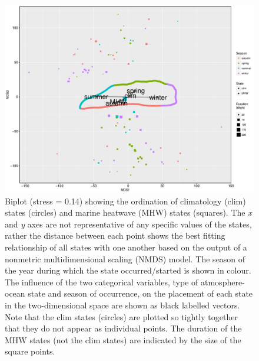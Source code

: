 \documentclass[utf8]{frontiersSCNS}
\begin{document}
\begin{figure}[]
\begin{center}
\includegraphics[width=1.0\textwidth]{figure_3.pdf}
\end{center}
\caption{Biplot (stress = 0.14) showing the ordination of climatology (clim) states (circles) and marine heatwave (MHW) states (squares). The \emph{x} and \emph{y} axes are not representative of any specific values of the states, rather the distance between each point shows the best fitting relationship of all states with one another based on the output of a nonmetric multidimensional scaling (NMDS) model. The season of the year during which the state occurred/started is shown in colour. The influence of the two categorical variables, type of atmosphere-ocean state and season of occurrence, on the placement of each state in the two-dimensional space are shown as black labelled vectors. Note that the clim states (circles) are plotted so tightly together that they do not appear as individual points. The duration of the MHW states (not the clim states) are indicated by the size of the square points.}
\label{figure3}
\end{figure}
\end{document}
